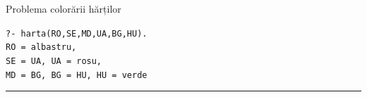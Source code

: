 \documentclass[xcolor=pdftex,romanian,colorlinks]{beamer}
\begin{document}
\begin{frame}[fragile]{Problema colorării hărților}




{\color{blue}\texttt{?- harta(RO,SE,MD,UA,BG,HU).\\
RO = albastru,\\
SE = UA, UA = rosu,\\
MD = BG, BG = HU, HU = verde}} \rule{0.6ex}{1.3ex}


\end{frame}

%
% 
%
\end{document}
